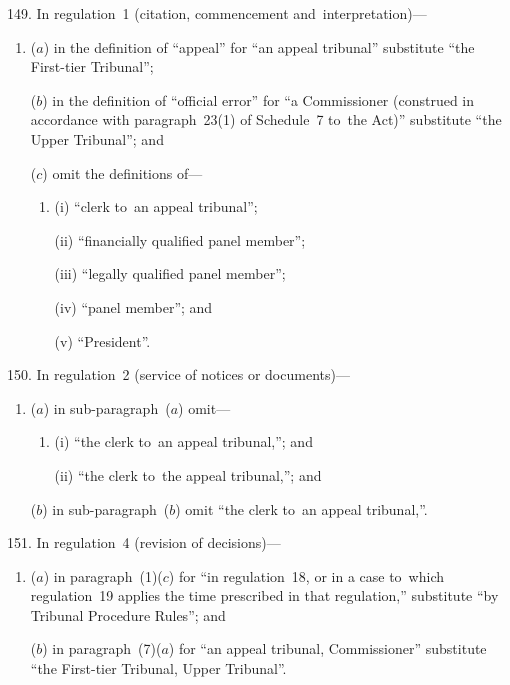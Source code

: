 \documentclass[12pt,a4paper]{article}
\begin{document}
\medskip

149.  In regulation~1 (citation, commencement and~interpretation)—
\begin{enumerate}\item[]
($a$) in the definition of “appeal” for “an appeal tribunal” substitute “the First-tier Tribunal”;

\enlargethispage{-3\baselineskip}

($b$) in the definition of “official error” for “a Commissioner (construed in accordance with paragraph~23(1) of Schedule~7 to~the Act)” substitute “the Upper Tribunal”; and

($c$) omit the definitions of—
\begin{enumerate}\item[]
(i) “clerk to~an appeal tribunal”;

(ii) “financially qualified panel member”;

(iii) “legally qualified panel member”;

(iv) “panel member”; and

(v) “President”.
\end{enumerate}
\end{enumerate}

\medskip

150.  In regulation~2 (service of notices or documents)—
\begin{enumerate}\item[]
($a$) in sub-paragraph~($a$)  omit—
\begin{enumerate}\item[]
(i) “the clerk to~an appeal tribunal,”; and

(ii) “the clerk to~the appeal tribunal,”; and
\end{enumerate}

($b$) in sub-paragraph~($b$)  omit “the clerk to~an appeal tribunal,”.
\end{enumerate}

\medskip

151.  In regulation~4 (revision of decisions)—
\begin{enumerate}\item[]
($a$) in paragraph~(1)($c$)  for “in regulation~18, or in a case to~which regulation~19 applies the time prescribed in that regulation,” substitute “by Tribunal Procedure Rules”; and

($b$) in paragraph~(7)($a$)  for “an appeal tribunal, Commissioner” substitute “the First-tier Tribunal, Upper Tribunal”.
\end{enumerate}
\end{document}
